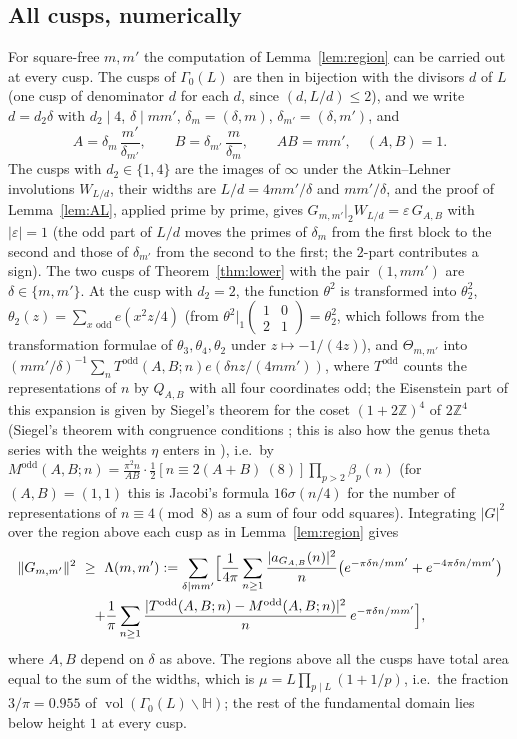 ﻿\documentclass[11pt]{amsart}
\theoremstyle{remark}
\newcommand{\Z}{\mathbb{Z}}
\newcommand{\HH}{\mathbb{H}}
\newcommand{\e}{\varepsilon}
\DeclareMathOperator{\vol}{vol}
\begin{document}
\subsection{All cusps, numerically}\label{subsec:allcusps}
For square-free $m,m'$ the computation of Lemma~\ref{lem:region} can be carried out at every cusp. The cusps of $\Gamma_0(L)$ are then in bijection with the divisors $d$ of $L$ (one cusp of denominator $d$ for each $d$, since $(d,L/d)\le2$), and we write $d=d_2\delta$ with $d_2\mid4$, $\delta\mid mm'$, $\delta_m=(\delta,m)$, $\delta_{m'}=(\delta,m')$, and
\[
A=\delta_m\,\frac{m'}{\delta_{m'}},\qquad B=\delta_{m'}\,\frac{m}{\delta_m},\qquad AB=mm',\quad (A,B)=1 .
\]
The cusps with $d_2\in\{1,4\}$ are the images of $\infty$ under the Atkin--Lehner involutions $W_{L/d}$, their widths are $L/d=4mm'/\delta$ and $mm'/\delta$, and the proof of Lemma~\ref{lem:AL}, applied prime by prime, gives $G_{m,m'}|_2W_{L/d}=\e\,G_{A,B}$ with $|\e|=1$ (the odd part of $L/d$ moves the primes of $\delta_m$ from the first block to the second and those of $\delta_{m'}$ from the second to the first; the $2$-part contributes a sign). The two cusps of Theorem~\ref{thm:lower} with the pair $(1,mm')$ are $\delta\in\{m,m'\}$. At the cusp with $d_2=2$, the function $\theta^2$ is transformed into $\theta_2^2$, $\theta_2(z)=\sum_{x\text{ odd}}e(x^2z/4)$ (from $\theta^2|_1\left(\begin{smallmatrix}1&0\\2&1\end{smallmatrix}\right)=\theta_2^2$, which follows from the transformation formulae of $\theta_3,\theta_4,\theta_2$ under $z\mapsto-1/(4z)$), and $\Theta_{m,m'}$ into $(mm'/\delta)^{-1}\sum_nT^{\mathrm{odd}}(A,B;n)e(\delta nz/(4mm'))$, where $T^{\mathrm{odd}}$ counts the representations of $n$ by $Q_{A,B}$ with all four coordinates odd; the Eisenstein part of this expansion is given by Siegel's theorem for the coset $(1+2\Z)^4$ of $2\Z^4$ (Siegel's theorem with congruence conditions \cite{SiegelII}; this is also how the genus theta series with the weights $\eta$ enters in \cite[p.~15]{Waibel}), i.e.\ by $M^{\mathrm{odd}}(A,B;n)=\frac{\pi^2n}{AB}\cdot\frac12[n\equiv2(A+B)\ (8)]\prod_{p>2}\beta_p(n)$ (for $(A,B)=(1,1)$ this is Jacobi's formula $16\sigma(n/4)$ for the number of representations of $n\equiv4\pmod8$ as a sum of four odd squares). Integrating $|G|^2$ over the region above each cusp as in Lemma~\ref{lem:region} gives
\begin{multline}\label{eq:allcusps}
\|G_{m,m'}\|^2\ \ge\ \Lambda(m,m'):=\sum_{\delta\mid mm'}\Bigl[\frac1{4\pi}\sum_{n\ge1}\frac{|a_{G_{A,B}}(n)|^2}{n}\bigl(e^{-\pi\delta n/mm'}+e^{-4\pi\delta n/mm'}\bigr)\\
+\frac1\pi\sum_{n\ge1}\frac{|T^{\mathrm{odd}}(A,B;n)-M^{\mathrm{odd}}(A,B;n)|^2}{n}\,e^{-\pi\delta n/mm'}\Bigr],
\end{multline}
where $A,B$ depend on $\delta$ as above. The regions above all the cusps have total area equal to the sum of the widths, which is $\mu=L\prod_{p\mid L}(1+1/p)$, i.e.\ the fraction $3/\pi=0.955$ of $\vol(\Gamma_0(L)\backslash\HH)$; the rest of the fundamental domain lies below height $1$ at every cusp.
\end{document}
